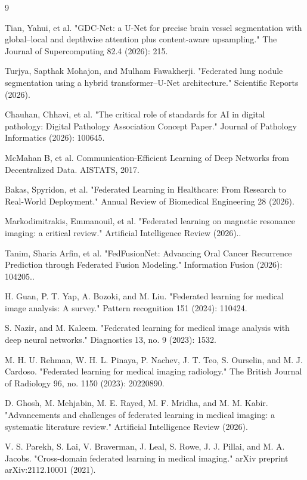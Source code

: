 \documentclass[conference]{IEEEtran}
\begin{document}
\begin{thebibliography}{9}


Tian, Yahui, et al. "GDC-Net: a U-Net for precise brain vessel segmentation with global–local and depthwise attention plus content-aware upsampling." The Journal of Supercomputing 82.4 (2026): 215.

Turjya, Sapthak Mohajon, and Mulham Fawakherji. "Federated lung nodule segmentation using a hybrid transformer–U-Net architecture." Scientific Reports (2026).

Chauhan, Chhavi, et al. "The critical role of standards for AI in digital pathology: Digital Pathology Association Concept Paper." Journal of Pathology Informatics (2026): 100645.

McMahan B, et al. Communication-Efficient Learning of Deep Networks from Decentralized Data. AISTATS, 2017.

Bakas, Spyridon, et al. "Federated Learning in Healthcare: From Research to Real-World Deployment." Annual Review of Biomedical Engineering 28 (2026).

Markodimitrakis, Emmanouil, et al. "Federated learning on magnetic resonance imaging: a critical review." Artificial Intelligence Review (2026)..

Tanim, Sharia Arfin, et al. "FedFusionNet: Advancing Oral Cancer Recurrence Prediction through Federated Fusion Modeling." Information Fusion (2026): 104205..

H. Guan, P. T. Yap, A. Bozoki, and M. Liu. "Federated learning for medical image analysis: A survey." Pattern recognition 151 (2024): 110424.

S. Nazir, and M. Kaleem. "Federated learning for medical image analysis with deep neural networks." Diagnostics 13, no. 9 (2023): 1532.


M. H. U. Rehman, W. H. L. Pinaya, P. Nachev, J. T. Teo, S. Ourselin, and M. J. Cardoso. "Federated learning for medical imaging radiology." The British Journal of Radiology 96, no. 1150 (2023): 20220890.


D. Ghosh, M. Mehjabin, M. E. Rayed, M. F. Mridha, and M. M. Kabir. "Advancements and challenges of federated learning in medical imaging: a systematic literature review." Artificial Intelligence Review (2026).

V. S. Parekh, S. Lai, V. Braverman, J. Leal, S. Rowe, J. J. Pillai, and M. A. Jacobs. "Cross-domain federated learning in medical imaging." arXiv preprint arXiv:2112.10001 (2021).


\end{thebibliography}
\end{document}
